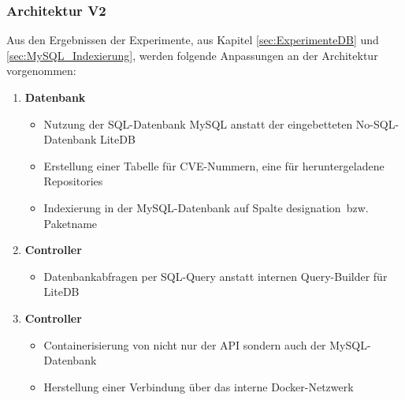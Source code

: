 \subsubsection{Architektur V2} \label{sec:ArchitekturV2}
    Aus den Ergebnissen der Experimente, aus Kapitel \ref{sec:ExperimenteDB} und \ref{sec:MySQL_Indexierung}, werden folgende Anpassungen an der Architektur vorgenommen:
    \begin{enumerate}
        \item \textbf{Datenbank}
            \begin{itemize}
                \item Nutzung der SQL-Datenbank MySQL anstatt der eingebetteten No-SQL-Datenbank LiteDB
                \item Erstellung einer Tabelle für \ac{CVE}-Nummern, eine für heruntergeladene Repositories
                \item Indexierung in der MySQL-Datenbank auf Spalte \glqq designation\grqq~bzw. Paketname
            \end{itemize}
        \item \textbf{Controller}
            \begin{itemize}
                \item Datenbankabfragen per SQL-Query anstatt internen Query-Builder für LiteDB
            \end{itemize}
        \item \textbf{Controller}
            \begin{itemize}
                \item Containerisierung von nicht nur der \ac{API} sondern auch der MySQL-Datenbank
                \item Herstellung einer Verbindung über das interne Docker-Netzwerk
            \end{itemize}
    \end{enumerate}